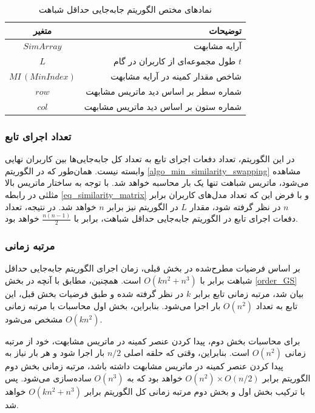 \begin{table}[h]
	\centering
	\caption{نمادهای مختص الگوریتم جابه‌جایی حداقل شباهت}
	\label{tabel_MinSimilaritySwapNotations}
	\begin{tabular}{cr}
		\hline
		متغیر & توضیحات \\
		\hline
		$SimArray$ & آرایه مشابهت \\
		$L$ & طول مجموعه‌ای از کاربران در گام $t$ \\
		$MI \, (MinIndex)$ & شاخص مقدار کمینه در آرایه مشابهت \\
		$row$ & شماره سطر بر اساس دید ماتریس مشابهت \\
		$col$ & شماره ستون بر اساس دید ماتریس مشابهت
	\end{tabular}
\end{table}



\vspace{3mm}
\subsubsection{
	تعداد اجرای تابع
}\vspace{-1mm}
در این الگوریتم، تعداد دفعات اجرای تابع
به تعداد کل جابه‌جایی‌ها بین کاربران نهایی وابسته نیست. همان‌طور که در الگوریتم
\ref{algo_min_similarity_swapping}
مشاهده می‌شود، ماتریس شباهت تنها یک بار محاسبه خواهد شد. با توجه به ساختار ماتریس بالا مثلثی در رابطه
\ref{eq_similarity_matrix}
و با فرض این که تعداد مدل‌های کاربران برابر \(n\) در نظر گرفته شود، مقدار \(L\) در الگوریتم نیز برابر \(n\) خواهد شد.
در نتیجه، تعداد دفعات اجرای تابع
در الگوریتم جابه‌جایی حداقل شباهت، برابر با \(\frac{n(n-1)}{2}\) خواهد بود.


\vspace{3mm}
\subsubsection{مرتبه زمانی}\vspace{-1mm}
بر اساس فرضیات مطرح‌شده در بخش قبلی، زمان اجرای الگوریتم جابه‌جایی حداقل شباهت برابر با \( O(kn^2 + n^3) \) است. همچنین، مطابق با آنچه در بخش
\ref{order_GS}
بیان شد، مرتبه زمانی تابع
برابر
$k$
در نظر گرفته شده و طبق فرضیات بخش قبل، این تابع به تعداد \( O(n^2) \) بار اجرا می‌شود. بنابراین، بخش اول محاسبات با مرتبه زمانی \( O(kn^2) \) مشخص می‌شود.


برای محاسبات بخش دوم، پیدا کردن عنصر کمینه در ماتریس مشابهت، خود از مرتبه زمانی \(O(n^2)\) است. بنابراین، وقتی که حلقه اصلی \(n/2\) بار اجرا شود و هر بار نیاز به پیدا کردن عنصر کمینه در ماتریس مشابهت داشته باشد، مرتبه زمانی بخش دوم الگوریتم برابر \(O(n^2) \times O(n/2)\) خواهد بود که به \(O(n^3)\) ساده‌سازی می‌شود.
پس با ترکیب بخش اول و بخش دوم مرتبه زمانی کل الگوریتم برابر
\( O(kn^2 + n^3) \) 
خواهد شد.



